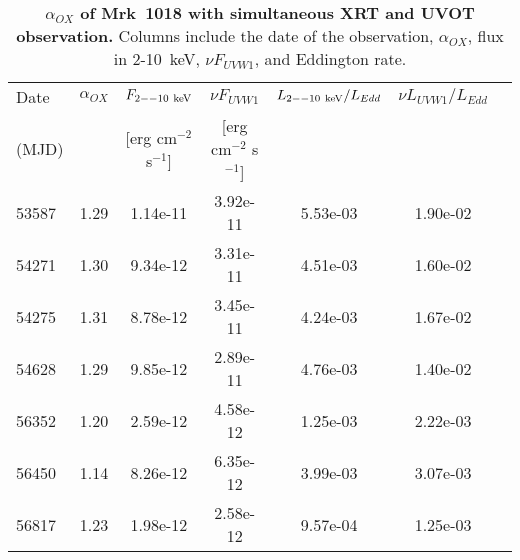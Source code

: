 \begin{comment}
\begin{table}
\centering
\caption{{\bf Host galaxy contribution and SED in UV band.} Columns include the band, spectrum, and date or contribution from host galaxy. Data come from \citet{2018MNRAS.480.3898N}.}
\label{tab:host_contribution}
\begin{tabular}{llllllll}
\hline
\hline
band & v & b & u & uw1 & um2 & uw2 & Note \\ 
Energy     & (2.26eV) & (2.8eV) & (3.5eV) & (4.7eV) & (5.5eV) & (6.4eV) \\ \hline
host & 1.33E-02 & 9.50E-03 & 2.65E-03 & 6.56E-04 & 4.00E-04 & 4.00E-04 &  \\ 
2008.08 & 1.00E-02 & 1.30E-02 & 1.64E-02 & 2.15E-02 & 2.38E-02 & 2.60E-02 &  \\ 
2013 & 1.20E-03 & 1.50E-03 & 1.79E-03 & 2.12E-03 & 2.27E-03 & 2.40E-03 &  \\ 
2016 & 4.70E-04 & 5.00E-04 & 5.16E-04 & 5.00E-04 & 4.80E-04 & 4.60E-04 &  \\  \hline
\end{tabular}   
\end{table}
\end{comment}


\begin{table}
\centering
\caption{{\bf $\alpha_{OX}$ of Mrk~1018 with simultaneous XRT and UVOT observation.} Columns include the date of the observation, $\alpha_{OX}$, flux in 2-10~keV, $\nu F_{UVW1}$, and Eddington rate.}
\label{tab:tablealpha_ox}
\begin{tabular}{lcccccc}
\hline
\hline
 
 Date &   $\alpha_{OX}$  & $F_{\rm{2--10~keV}}$  &$\nu F_{UVW1}$  & $L_{\rm{2--10~keV}}/L_{Edd}$ &   $\nu L_{UVW1}/L_{Edd}$  \\ 
 (MJD)&                   &   [erg cm$^{-2}$ s$^{-1}$]   &[erg cm$^{-2}$ s$^{-1}$]    &                    &            
 \\ \hline
53587 & 1.29 & 1.14e-11 & 3.92e-11 & 5.53e-03 & 1.90e-02 \\ 
54271 & 1.30 & 9.34e-12 & 3.31e-11 & 4.51e-03 & 1.60e-02 \\ 
54275 & 1.31 & 8.78e-12 & 3.45e-11 & 4.24e-03 & 1.67e-02 \\ 
54628 & 1.29 & 9.85e-12 & 2.89e-11 & 4.76e-03 & 1.40e-02 \\ 
56352 & 1.20 & 2.59e-12 & 4.58e-12 & 1.25e-03 & 2.22e-03 \\ 
56450 & 1.14 & 8.26e-12 & 6.35e-12 & 3.99e-03 & 3.07e-03 \\ 
56817 & 1.23 & 1.98e-12 & 2.58e-12 & 9.57e-04 & 1.25e-03 \\ \hline
\end{tabular}   
\end{table}